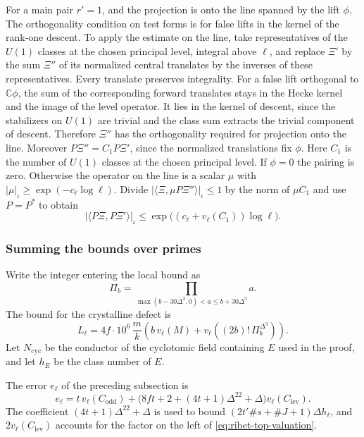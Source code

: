 For a main pair \(r'=1\), and the projection is onto the line
spanned by the lift \(\phi\). The orthogonality condition on test
forms is for false lifts in the kernel of the rank-one descent.
To apply the estimate on the line, take representatives of the
\(U(1)\) classes at the chosen principal level, integral above
\(\ell\), and replace \(\Xi'\) by the sum \(\Xi''\) of its normalized
central translates by the inverses of these representatives.
Every translate preserves integrality. For a false lift orthogonal
to \(\mathbb C\phi\), the sum of the corresponding forward translates
stays in the Hecke kernel and the image of the level operator.
It lies in the kernel of descent, since the stabilizers on \(U(1)\)
are trivial and the class sum extracts the trivial component of
descent. Therefore \(\Xi''\) has the orthogonality required for
projection onto the line. Moreover \(P\Xi''=C_1P\Xi'\), since
the normalized translations fix \(\phi\). Here \(C_1\) is the
number of \(U(1)\) classes at the chosen principal level.
If \(\phi=0\) the pairing is zero. Otherwise the operator on the
line is a scalar \(\mu\) with
\(|\mu|_\iota\ge\exp(-c_\ell\log\ell)\).
Divide \(|\langle\Xi,\mu P\Xi''\rangle|_\iota\le1\) by the norm
of \(\mu C_1\) and use \(P=P^\ast\) to obtain
\[
 |\langle P\Xi,P\Xi'\rangle|_\iota
    \le\exp\bigl((c_\ell+v_\ell(C_1))\log\ell\bigr).
\]

\subsubsection{Summing the bounds over primes}

Write the integer entering the local bound as
\[
 \Pi_b=\prod_{\max(b-30\Delta^3,0)<a\le b+30\Delta^3}a .
\]
The bound for the crystalline defect is
\[
 L_\ell=4f\cdot 10^6\,\frac{m}{k}
        \left(b\,v_\ell(M)+v_\ell\!\left((2b)!\,\Pi_b^{\Delta^3}\right)\right).
\]
Let \(N_{\mathrm{cyc}}\) be the conductor of the cyclotomic field containing \(E\) used in the proof, and let \(h_E\) be the class number of \(E\).



The error \(e_\ell\) of the preceding subsection is
\[
 e_\ell=t\,v_\ell(C_{\mathrm{odd}})
  +\bigl(8ft+2+(4t+1)\Delta^{22}+\Delta\bigr)v_\ell(C_{\mathrm{lev}}).
\]
The coefficient \((4t+1)\Delta^{22}+\Delta\) is used to bound
\((2t'\#s+\#J+1)\Delta h_\ell\), and \(2v_\ell(C_{\mathrm{lev}})\)
accounts for the factor on the left of \eqref{eq:ribet-top-valuation}.

